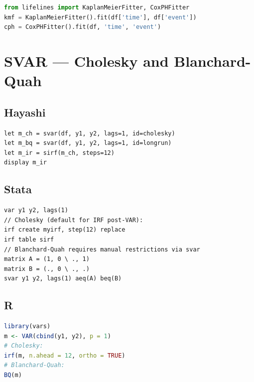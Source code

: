 \begin{lstlisting}[language=Python, basicstyle=\ttfamily\small,
  frame=single, numbers=none, backgroundcolor=\color{codbg},
  keywordstyle=\color{keyword}\bfseries,
  stringstyle=\color{string},
  commentstyle=\color{comment}\itshape]
from lifelines import KaplanMeierFitter, CoxPHFitter
kmf = KaplanMeierFitter().fit(df['time'], df['event'])
cph = CoxPHFitter().fit(df, 'time', 'event')
\end{lstlisting}

\section{SVAR — Cholesky and Blanchard-Quah}

\subsection*{Hayashi}

\begin{lstlisting}
let m_ch = svar(df, y1, y2, lags=1, id=cholesky)
let m_bq = svar(df, y1, y2, lags=1, id=longrun)
let m_ir = sirf(m_ch, steps=12)
display m_ir
\end{lstlisting}

\subsection*{Stata}

\begin{lstlisting}[language={}, basicstyle=\ttfamily\small,
  frame=single, numbers=none, backgroundcolor=\color{codbg}]
var y1 y2, lags(1)
// Cholesky (default for IRF post-VAR):
irf create myirf, step(12) replace
irf table sirf
// Blanchard-Quah requires manual restrictions via svar
matrix A = (1, 0 \ ., 1)
matrix B = (., 0 \ ., .)
svar y1 y2, lags(1) aeq(A) beq(B)
\end{lstlisting}

\subsection*{R}

\begin{lstlisting}[language=R, basicstyle=\ttfamily\small,
  frame=single, numbers=none, backgroundcolor=\color{codbg},
  keywordstyle=\color{keyword}\bfseries,
  stringstyle=\color{string},
  commentstyle=\color{comment}\itshape]
library(vars)
m <- VAR(cbind(y1, y2), p = 1)
# Cholesky:
irf(m, n.ahead = 12, ortho = TRUE)
# Blanchard-Quah:
BQ(m)
\end{lstlisting}

